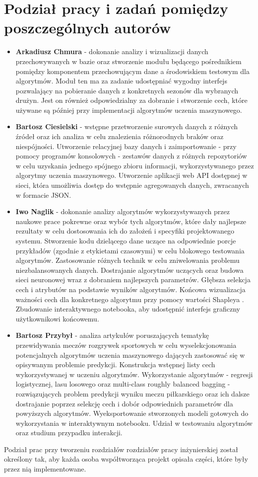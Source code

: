 \section{Podział pracy i zadań pomiędzy poszczególnych autorów}
\begin{itemize}
    \item \textbf{Arkadiusz Chmura} - dokonanie analizy i wizualizacji danych przechowywanych w bazie oraz stworzenie modułu będącego pośrednikiem pomiędzy komponentem przechowującym dane a środowiskiem testowym dla algorytmów. Moduł ten ma za zadanie udostępniać wygodny interfejs pozwalający na pobieranie danych z konkretnych sezonów dla wybranych drużyn. Jest on również odpowiedzialny za dobranie i stworzenie cech, które używane są później przy implementacji algorytmów uczenia maszynowego.
    \item \textbf{Bartosz Ciesielski} - wstępne przetworzenie surowych danych z różnych źródeł oraz ich analiza w celu znalezienia różnorodnych braków oraz niespójności. Utworzenie relacyjnej bazy danych i zaimportowanie - przy pomocy programów konsolowych - zestawów danych z różnych repozytoriów w celu uzyskania jednego spójnego zbioru informacji, wykorzystywanego przez algorytmy uczenia maszynowego. Utworzenie aplikacji web API  dostępnej w sieci, która umożliwia dostęp do wstępnie agregowanych danych, zwracanych w formacie JSON.
    \item \textbf{Iwo Naglik} - dokonanie analizy algorytmów wykorzystywanych przez naukowe prace pokrewne oraz wybór tych algorytmów, które dały najlepsze rezultaty w celu dostosowania ich do założeń i specyfiki projektowanego systemu. Stworzenie kodu dzielącego dane uczące na odpowiednie porcje przykładów (zgodnie z etykietami czasowymi) w celu blokowego testowania algorytmów. Zastosowanie różnych technik w celu zniwelowania problemu niezbalansowanych danych. Dostrajanie algorytmów uczących oraz budowa sieci neuronowej wraz z dobraniem najlepszych parametrów. Głębsza selekcja cech i atrybutów na podstawie wyników algorytmów. Końcowa wizualizacja ważności cech dla konkretnego algorytmu przy pomocy wartości Shapleya \cite{shapley}. Zbudowanie interaktywnego notebooka, aby udostępnić interfejs graficzny użytkownikowi końcowemu.
    \item \textbf{Bartosz Przybył} - analiza artykułów poruszających tematykę przewidywania meczów rozgrywek sportowych w celu wyselekcjonowania potencjalnych algorytmów uczenia maszynowego dających zastosować się w opisywanym problemie predykcji. Konstrukcja wstępnej listy cech wykorzystywanej w uczeniu algorytmów. Wykorzystanie algorytmów - regresji logistycznej, lasu losowego oraz multi-class roughly balanced bagging - rozwiązujących problem predykcji wyniku meczu piłkarskiego oraz ich dalsze dostrajanie poprzez selekcję cech i dobór odpowiednich parametrów dla powyższych algorytmów. Wyeksportowanie stworzonych modeli gotowych do wykorzystania w interaktywnym notebooku. Udział w testowaniu algorytmów oraz studium przypadku interakcji.
\end{itemize}
Podział prac przy tworzeniu rozdziałów rozdziałów pracy inżynierskiej został określony tak, aby każda osoba współtworząca projekt opisała części, które były przez nią implementowane.

\newpage\null\thispagestyle{empty}\newpage